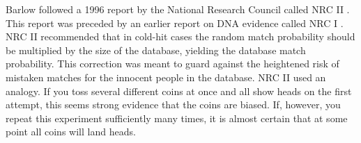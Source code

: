 \documentclass{article}
\begin{document}
Barlow followed a 1996 report by the National Research Council called NRC II %
\citep{NRCII1996}. This report was preceded by an earlier report on DNA evidence called NRC I \citep{NRCI1992}. NRC II  recommended that in cold-hit cases the random match probability %
should be multiplied by the size of the database, yielding the database match probability. %
%
%
 This correction was meant to guard against the heightened risk of mistaken matches  for  the innocent people in the database. 
%
NRC II used an analogy. 
If you toss several different coins at once and all show heads on the first attempt, this seems strong evidence that the coins are biased. If, however, you repeat this experiment sufficiently many times, it is almost certain that at some point all coins will land heads. 
\end{document}
